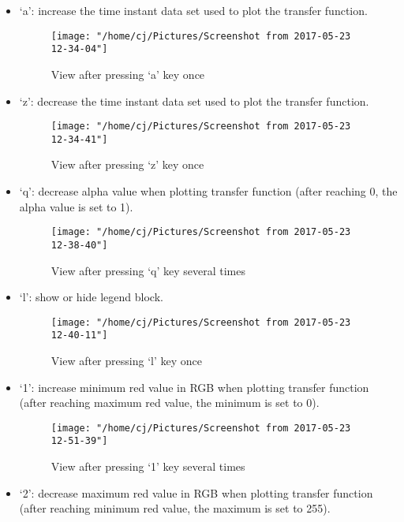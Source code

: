 \documentclass{article}
\begin{document}
\begin{itemize}
  \item `a': increase the time instant data set used to plot the transfer function.

  \begin{figure}[H]
    \centering
    \texttt{[image: "/home/cj/Pictures/Screenshot from 2017-05-23 12-34-04"]}
    \caption{View after pressing `a' key once}
  \end{figure}

  \item `z': decrease the time instant data set used to plot the transfer function.

  \begin{figure}[H]
    \centering
    \texttt{[image: "/home/cj/Pictures/Screenshot from 2017-05-23 12-34-41"]}
    \caption{View after pressing `z' key once}
  \end{figure}

  \item `q': decrease alpha value when plotting transfer function (after reaching 0, the alpha value is set to 1).

  \begin{figure}[H]
    \centering
    \texttt{[image: "/home/cj/Pictures/Screenshot from 2017-05-23 12-38-40"]}
    \caption{View after pressing `q' key several times}
  \end{figure}

  \item `l': show or hide legend block.

  \begin{figure}[H]
    \centering
    \texttt{[image: "/home/cj/Pictures/Screenshot from 2017-05-23 12-40-11"]}
    \caption{View after pressing `l' key once}
  \end{figure}

  \item `1': increase minimum red value in RGB when plotting transfer function (after reaching maximum red value, the minimum is set to 0).

  \begin{figure}[H]
    \centering
    \texttt{[image: "/home/cj/Pictures/Screenshot from 2017-05-23 12-51-39"]}
    \caption{View after pressing `1' key several times}
  \end{figure}

  \item `2': decrease maximum red value in RGB when plotting transfer function (after reaching minimum red value, the maximum is set to 255).


\end{itemize}
\end{document}
